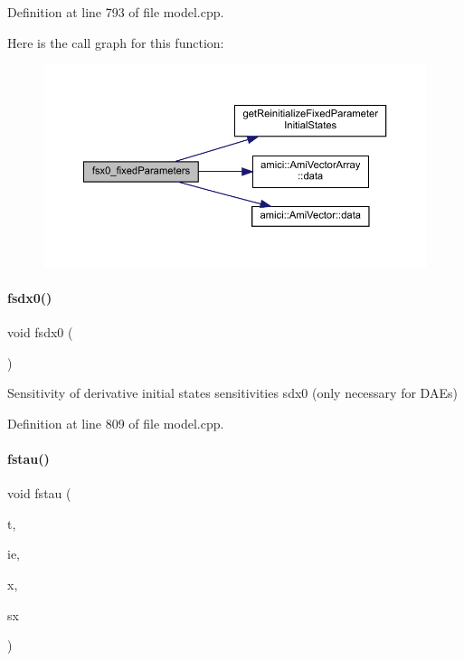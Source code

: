 Definition at line 793 of file model.\+cpp.

Here is the call graph for this function\+:
\nopagebreak
\begin{figure}[H]
\begin{center}
\leavevmode
\includegraphics[width=350pt]{classamici_1_1_model_acd951497e01220e545bbb238cc48e7bb_cgraph}
\end{center}
\end{figure}
\mbox{\label{classamici_1_1_model_a946b60982bd7321bcc2bdae10ea8358f}} 
\paragraph{\texorpdfstring{fsdx0()}{fsdx0()}}
{\footnotesize\ttfamily void fsdx0 (\begin{DoxyParamCaption}{ }\end{DoxyParamCaption})\hspace{0.3cm}{\ttfamily [virtual]}}

Sensitivity of derivative initial states sensitivities sdx0 (only necessary for D\+A\+Es) 

Definition at line 809 of file model.\+cpp.

\mbox{\label{classamici_1_1_model_a382cd2049c70f0dd4aafe483e4a50cff}} 
\paragraph{\texorpdfstring{fstau()}{fstau()}\hspace{0.1cm}{\footnotesize\ttfamily [1/2]}}
{\footnotesize\ttfamily void fstau (\begin{DoxyParamCaption}\item[{const \mbox{\hyperlink{namespaceamici_a1bdce28051d6a53868f7ccbf5f2c14a3}{realtype}}}]{t,  }\item[{const int}]{ie,  }\item[{const \mbox{\hyperlink{classamici_1_1_ami_vector}{Ami\+Vector}} $\ast$}]{x,  }\item[{const \mbox{\hyperlink{classamici_1_1_ami_vector_array}{Ami\+Vector\+Array}} $\ast$}]{sx }\end{DoxyParamCaption})}

